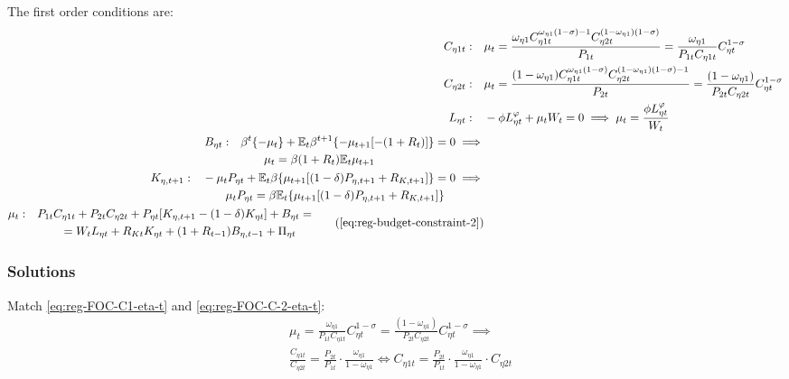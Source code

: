 \documentclass[
thesis.tex
]{subfiles}
\begin{document}
The first order conditions are:
\begin{align}
	C_{\eta 1 t}: \quad & \mu_t = \frac{\omega_{\eta 1} C_{\eta 1 t}^{\omega_{\eta 1} (1 -\sigma) -1} C_{\eta 2 t}^{(1 -\omega_{\eta 1})(1 -\sigma)}}{P_{1 t}} = \frac{\omega_{\eta 1}}{P_{1 t} C_{\eta 1 t}} C_{\eta t}^{1 -\sigma} \label{eq:reg-FOC-C1-eta-t} 
	\\
	C_{\eta 2 t}: \quad & \mu_t = \frac{(1 -\omega_{\eta 1}) C_{\eta 1 t}^{\omega_{\eta 1} (1 -\sigma)} C_{\eta 2 t}^{(1 -\omega_{\eta 1})(1 -\sigma)-1}}{P_{2 t}} = \frac{(1 -\omega_{\eta 1})}{P_{2 t} C_{\eta 2 t}} C_{\eta t}^{1 -\sigma} \label{eq:reg-FOC-C-2-eta-t} 
	\\
	L_{\eta t}: \quad & -\phi L_{\eta t}^{\varphi} +\mu_t W_t = 0 \implies \mu_t = \frac{\phi L_{\eta t}^{\varphi}}{W_t} \label{eq:reg-household-FOC-Lt} 
	\\
	\begin{split}
		B_{\eta t}: \quad & \beta^t \{-\mu_t\} + \E \beta^{t+1} \{ -\mu_{t+1} [-(1 + R_{t})] \} = 0 \implies \\ & \qquad \mu_t = \beta (1 + R_{t}) \E{ \mu_{t+1}}
	\end{split} \label{eq:reg-FOC-Bt}
	\\
	\begin{split}
		K_{\eta, t+1}: \quad & -\mu_t P_{\eta t} + \mathbb{E}_t \beta \{ \mu_{t+1} [(1-\delta) P_{\eta, t+1} + R_{K,t+1}] \} = 0 \implies \\ & \qquad \mu_t P_{\eta t} = \beta \mathbb{E}_t \{ \mu_{t+1} [(1-\delta) P_{\eta, t+1} + R_{K,t+1}] \}
	\end{split} \label{eq:reg-household-FOC-Kt} \\
	\begin{split}
		\mu_t: \quad & P_{1 t} C_{\eta 1 t} + P_{2 t} C_{\eta 2 t} + P_{\eta t} [ K_{\eta, t+1} - (1-\delta)K_{\eta t} ] + B_{\eta t} = \\ & \qquad = W_t L_{\eta t} + R_{Kt} K_{\eta t} + (1 + R_{t-1}) B_{\eta,t-1} + \Pi_{\eta t}
	\end{split} \tag{\ref{eq:reg-budget-constraint-2}}
\end{align}

\subsubsection*{Solutions}

Match \ref{eq:reg-FOC-C1-eta-t} and \ref{eq:reg-FOC-C-2-eta-t}:
\begin{align}
	& \mu_t = \frac{\omega_{\eta 1}}{P_{1 t} C_{\eta 1 t}} C_{\eta t}^{1 -\sigma} = \frac{(1 -\omega_{\eta 1})}{P_{2 t} C_{\eta 2 t}} C_{\eta t}^{1 -\sigma} \implies \nonumber \\
	& \frac{C_{\eta 1 t}}{C_{\eta 2 t}} = \frac{P_{2 t}}{P_{1 t}} \cdot \frac{\omega_{\eta 1}}{1 -\omega_{\eta 1}} \iff C_{\eta 1 t} = \frac{P_{2 t}}{P_{1 t}} \cdot \frac{\omega_{\eta 1}}{1 -\omega_{\eta 1}} \cdot C_{\eta 2 t} \label{eq:reg-FOC-C1-C2}
\end{align}
\end{document}
